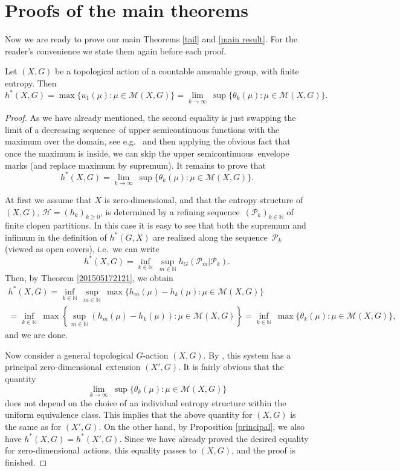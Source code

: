 \documentclass[12pt]{amsart}
\theoremstyle{definition}
\newenvironment{customthm}[1]
  {\renewcommand\theinnercustomthm{#1}\innercustomthm}
  {\endinnercustomthm}
\numberwithin{equation}{section}
\def \N {\mathbb N}
\def \H {\mathcal H}
\def \P {\mathcal P}
\def \M {\mathcal M}
\def \sq {sequence}
\def \usc {upper semicontinuous}
\def \zd {zero-dimen\-sio\-nal}
\def \N {\mathbb N}
\def \H {\mathcal H}
\def \P {\mathcal P}
\def \M {\mathcal M}
\def \sq {sequence}
\def \usc {upper semicontinuous}
\begin{document}
\section{Proofs of the main theorems}
Now we are ready to prove our main Theorems \ref{tail} and \ref{main result}. For the  reader's convenience we state them again before each proof.

\begin{customthm}{2.1}
Let $(X,G)$ be a topological action of a countable amenable group, with finite entropy. Then
$$
h^* (X,G)= \max \{u_1 (\mu): \mu\in \M(X,G)\}= \lim_{k\rightarrow \infty} 
\ \sup\{\theta_k (\mu):\mu\in\M(X,G)\}.
$$
\end{customthm}

\begin{proof}
As we have already mentioned, the second equality is just swapping the limit of a decreasing \sq\ of upper semicontinuous functions with the maximum over the domain, see e.g.\ \cite[Proposition 2.4 ]{BD} and then applying the obvious fact that once the maximum is inside, we can skip the \usc\ envelope marks (and replace maximum by supremum). It remains to prove that
\begin{equation} \label{xxxx}
	h^* (X,G)= \lim_{k\rightarrow \infty}\ \sup\{\theta_k (\mu):\mu\in\M(X,G)\}.
\end{equation}


At first we assume that $X$ is \zd, and that the entropy structure of $(X,G)$, $\H=(h_k)_{k\ge 0}$, is determined by a refining \sq\ $(\P_k)_{k\in\N}$ of finite clopen partitions. In this case it is easy to see that both the supremum and infimum in the definition of $h^*(G,X)$ are realized along the \sq\ $\P_k$ (viewed as open covers), i.e.\ we can write
\begin{equation} \label{bridge}
h^* (X,G)= \inf_{k\in \mathbb{N}}\ \sup_{m\in \mathbb{N}} h_G (\P_m| \P_k).
\end{equation}
Then, by Theorem \ref{201505172121}, we obtain 
\begin{multline*}
h^* (X,G)= \inf_{k\in\N}\ \sup_{m\in\N}\ \max\{h_m(\mu)-h_k(\mu):\mu\in\M (X,G)\}\\
=\inf_{k\in\N}\ \max\left\{\sup_{m\in\N}(h_m(\mu)-h_k(\mu)):\mu\in\M (X,G)\right\}=
\inf_{k\in\N}\ \max\{\theta_k(\mu):\mu\in\M (X,G)\},
\end{multline*}
and we are done.
	  
Now consider a general topological $G$-action $(X,G)$.  By \cite[Theorem 3.2]{H}, this system has a principal \zd\ extension $(X',G)$. It is fairly obvious that the quantity 
$$
\lim_{k\rightarrow \infty}\ \sup\{\theta_k (\mu):\mu\in\M(X,G)\}
$$
does not depend on the choice of an individual entropy structure within the uniform equivalence class. This implies that the above quantity for $(X,G)$ is the same as for $(X',G)$. On the other hand, by Proposition \ref{principal}, we also have $h^*(X,G)=h^*(X',G)$. Since we have already proved the desired  equality for \zd\ actions, this equality passes to $(X,G)$, and the proof is finished.
\end{proof}
\end{document}
